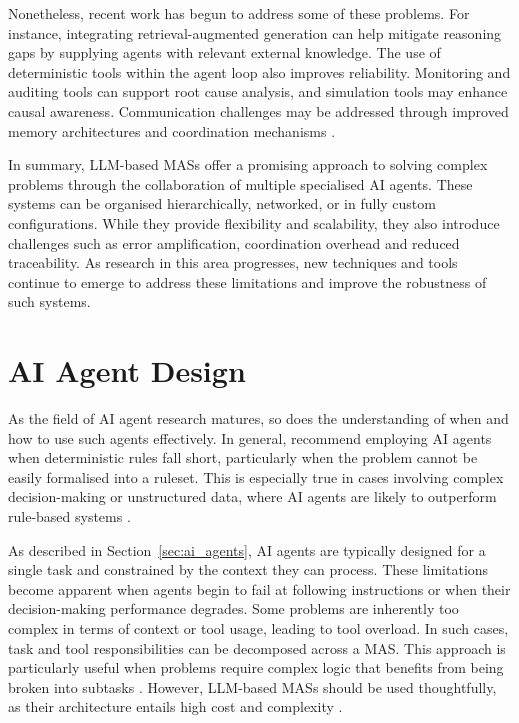 \documentclass[a4paper,oneside,bibliography=totoc]{scrbook}
\begin{document}
Nonetheless, recent work has begun to address some of these problems. For instance, integrating retrieval-augmented generation can help mitigate reasoning gaps by supplying agents with relevant external knowledge. The use of deterministic tools within the agent loop also improves reliability. Monitoring and auditing tools can support root cause analysis, and simulation tools may enhance causal awareness. Communication challenges may be addressed through improved memory architectures and coordination mechanisms \cite{Sapkota2025}.

In summary, \ac{LLM}-based \acp{MAS} offer a promising approach to solving complex problems through the collaboration of multiple specialised \ac{AI} agents. These systems can be organised hierarchically, networked, or in fully custom configurations. While they provide flexibility and scalability, they also introduce challenges such as error amplification, coordination overhead and reduced traceability. As research in this area progresses, new techniques and tools continue to emerge to address these limitations and improve the robustness of such systems.

\section{AI Agent Design}
\label{sec:agent_design}

As the field of \ac{AI} agent research matures, so does the understanding of when and how to use such agents effectively. In general, \citet{OpenAI2025} recommend employing \ac{AI} agents when deterministic rules fall short, particularly when the problem cannot be easily formalised into a ruleset. This is especially true in cases involving complex decision-making or unstructured data, where \ac{AI} agents are likely to outperform rule-based systems \cite{OpenAI2025}.

As described in Section~\ref{sec:ai_agents}, \ac{AI} agents are typically designed for a single task and constrained by the context they can process. These limitations become apparent when agents begin to fail at following instructions or when their decision-making performance degrades. Some problems are inherently too complex in terms of context or tool usage, leading to tool overload. In such cases, task and tool responsibilities can be decomposed across a \ac{MAS}. This approach is particularly useful when problems require complex logic that benefits from being broken into subtasks \cite{OpenAI2025,LangChain2025b}. However, \ac{LLM}-based \acp{MAS} should be used thoughtfully, as their architecture entails high cost and complexity \cite{Hadfield2025}.
\end{document}
